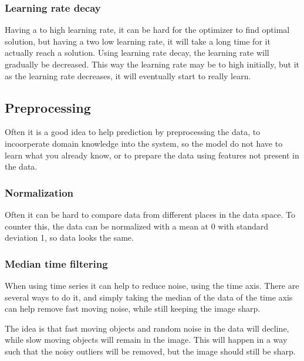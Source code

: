 \subsubsection{Learning rate decay} %
\label{ssub:learning_rate_decay}
Having a to high learning rate, it can be hard for the optimizer to find optimal solution, but having a two low learning rate, it will take a long time for it actually reach a solution.
Using learning rate decay, the learning rate will gradually be decreased.
This way the learning rate may be to high initially, but it as the learning rate decreases, it will eventually start to really learn.


\subsection{Preprocessing} %
\label{sub:preprocessing}
Often it is a good idea to help prediction by preprocessing the data, to incoorperate domain knowledge into the system, so the model do not have to learn what you already know, or to prepare the data using features not present in the data.
\subsubsection{Normalization} %
\label{ssub:normalization}
Often it can be hard to compare data from different places in the data space.
To counter this, the data can be normalized with a mean at 0 with standard deviation 1, so data looks the same.

\subsubsection{Median time filtering} %
\label{ssub:median_time_filtering}
When using time series it can help to reduce noise, using the time axis.
There are several ways to do it, and simply taking the median of the data of the time axis can help remove fast moving noise, while still keeping the image sharp.

The idea is that fast moving objects and random noise in the data will decline, while slow moving objects will remain in the image.
This will happen in a way such that the noisy outliers will be removed, but the image should still be sharp.

